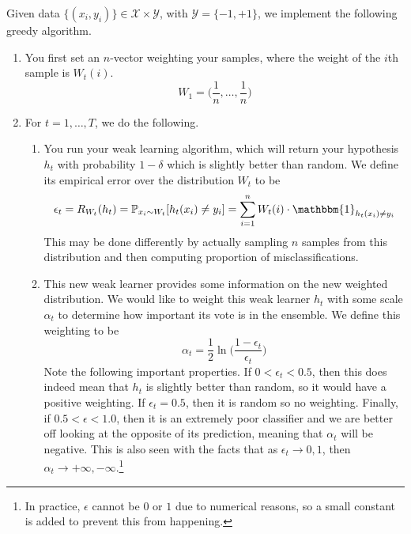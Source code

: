 \documentclass{article}
\begin{document}
        \begin{definition}
          Given data $\{(x_i, y_i)\} \in \mathcal{X} \times \mathcal{Y}$, with $\mathcal{Y} = \{-1, +1\}$, we implement the following greedy algorithm. 
          \begin{enumerate}
            \item You first set an $n$-vector weighting your samples, where the weight of the $i$th sample is $W_t (i)$. 
              \begin{equation}
                W_1 = \big( \frac{1}{n}, \ldots, \frac{1}{n} \big)
              \end{equation}

            \item For $t = 1, \ldots, T$, we do the following. 
              \begin{enumerate}
                \item You run your weak learning algorithm, which will return your hypothesis $h_t$ with probability $1 - \delta$ which is slightly better than random. We define its empirical error over the distribution $W_t$ to be 
                  \begin{equation}
                    \epsilon_t = R_{W_t} (h_t) = \mathbb{P}_{x_i \sim W_t} [ h_t (x_i) \neq y_i] = \sum_{i=1}^n W_t (i) \cdot \mathbbm{1}_{h_t (x_i) \neq y_i}
                  \end{equation}
                  This may be done differently by actually sampling $n$ samples from this distribution and then computing proportion of misclassifications. 

                \item This new weak learner provides some information on the new weighted distribution. We would like to weight this weak learner $h_t$ with some scale $\alpha_t$ to determine how important its vote is in the ensemble. We define this weighting to be 
                  \begin{equation}
                    \alpha_t = \frac{1}{2} \ln \bigg( \frac{1 - \epsilon_t}{\epsilon_t} \bigg)
                  \end{equation}
                Note the following important properties. If $0 < \epsilon_t < 0.5$, then this does indeed mean that $h_t$ is slightly better than random, so it would have a positive weighting. If $\epsilon_t = 0.5$, then it is random so no weighting. Finally, if $0.5 < \epsilon < 1.0$, then it is an extremely poor classifier and we are better off looking at the opposite of its prediction, meaning that $\alpha_t$ will be negative.
                This is also seen with the facts that as $\epsilon_t \rightarrow 0, 1$, then $\alpha_t \rightarrow +\infty, -\infty$.\footnote{In practice, $\epsilon$ cannot be $0$ or $1$ due to numerical reasons, so a small constant is added to prevent this from happening.} 


\end{enumerate}
\end{enumerate}
\end{definition}
\end{document}
